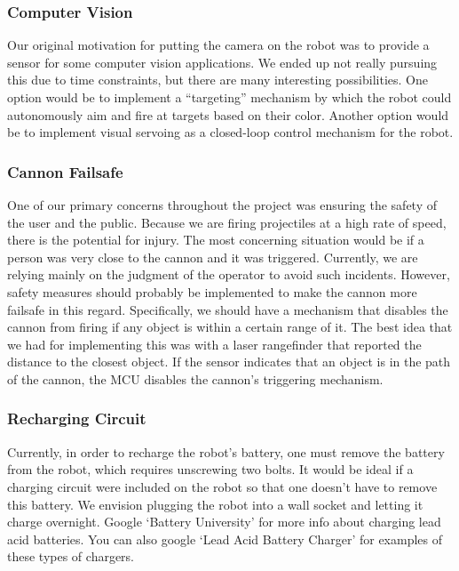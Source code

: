 \documentclass[letterpaper,12pt]{article}
\begin{document}
\subsubsection{Computer Vision}
Our original motivation for putting the camera on the robot was to provide a
sensor for some computer vision applications. We ended up not really pursuing
this due to time constraints, but there are many interesting possibilities. One
option would be to implement a ``targeting'' mechanism by which the robot could
autonomously aim and fire at targets based on their color. Another option would
be to implement visual servoing as a closed-loop control mechanism for the
robot.

\subsubsection{Cannon Failsafe}
One of our primary concerns throughout the project was ensuring the safety of
the user and the public. Because we are firing projectiles at a high rate of
speed, there is the potential for injury. The most concerning situation would be
if a person was very close to the cannon and it was triggered. Currently, we are
relying mainly on the judgment of the operator to avoid such incidents. However,
safety measures should probably be implemented to make the cannon more failsafe
in this regard. Specifically, we should have a mechanism that disables the
cannon from firing if any object is within a certain range of it. The best idea
that we had for implementing this was with a laser rangefinder that reported the
distance to the closest object. If the sensor indicates that an object is in the
path of the cannon, the MCU disables the cannon's triggering mechanism.

\subsubsection{Recharging Circuit}
Currently, in order to recharge the robot's battery, one must remove the
battery from the robot, which requires unscrewing two bolts. It would be ideal
if a charging circuit were included on the robot so that one doesn't have to
remove this battery. We envision plugging the robot into a wall socket and
letting it charge overnight. Google `Battery University' for more info about
charging lead acid batteries. You can also google `Lead Acid Battery Charger'
for examples of these types of chargers.
\end{document}
